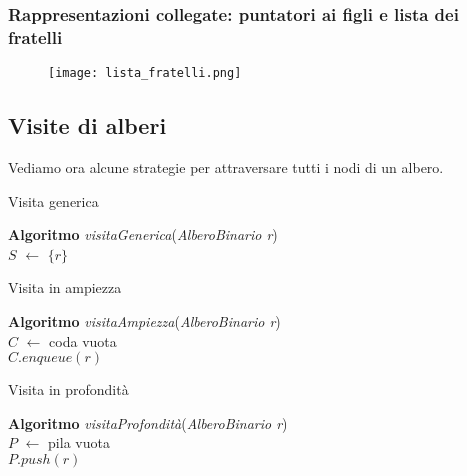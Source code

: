 \subsubsection{Rappresentazioni collegate: puntatori ai figli e lista dei fratelli}
\begin{figure}[h]
    \texttt{[image: lista\_fratelli.png]}
\end{figure}

\subsection{Visite di alberi}
Vediamo ora alcune strategie per attraversare tutti i nodi di un albero.
\begin{algorithm}
    \caption{Visita generica}
    \Indm\textbf{Algoritmo} \emph{visitaGenerica}(\emph{AlberoBinario r})\\
    \Indp$S$ $\leftarrow$ $\lbrace r \rbrace$\\
\end{algorithm}

\begin{algorithm}
    \caption{Visita in ampiezza}
    \Indm\textbf{Algoritmo} \emph{visitaAmpiezza}(\emph{AlberoBinario r})\\
    \Indp$C$ $\leftarrow$ coda vuota\\
    $C.enqueue(r)$\\
\end{algorithm}

\begin{algorithm}
    \caption{Visita in profondità}
    \Indm\textbf{Algoritmo} \emph{visitaProfondità}(\emph{AlberoBinario r})\\
    \Indp$P$ $\leftarrow$ pila vuota\\
    $P.push(r)$\\
\end{algorithm}

